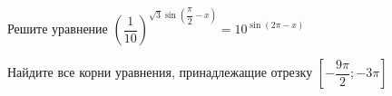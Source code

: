 \begin{ex}
	\begin{condition}
		\begin{enumcols}[label=\asbuk*)]
			\item Решите уравнение \( \left(\dfrac{1}{10}\right)^{\sqrt{3}\sin{\left(\dfrac{\pi}{2} - x\right)}} = 10^{\sin (2\pi - x)} \)
			\item Найдите все корни уравнения, принадлежащие отрезку \( \left[-\dfrac{9\pi}{2};-3\pi\right] \)
		\end{enumcols}
	\end{condition}
\end{ex}